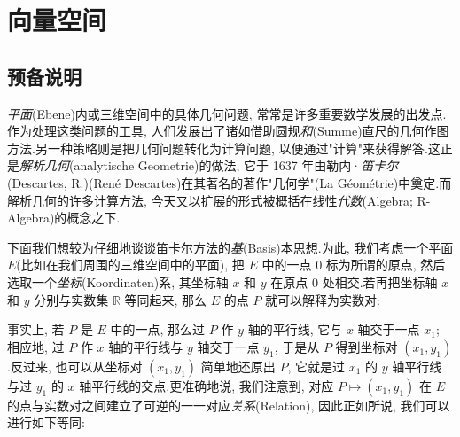 \chapter{向量空间}

\section*{预备说明}

\emph{平面}(\textup{Ebene})内或三维空间中的具体几何问题, 常常是许多重要数学发展的出发点.作为处理这类问题的工具, 人们发展出了诸如借助圆规\emph{和}(\textup{Summe})直尺的几何作图方法.另一种策略则是把几何问题转化为计算问题, 以便通过"计算"来获得解答.这正是\emph{解析几何}(\textup{analytische Geometrie})的做法, 它于 1637 年由勒内·\emph{笛卡尔}(\textup{Descartes, R.})(René Descartes)在其著名的著作"几何学"(La G\'eom\'etrie)中奠定.而解析几何的许多计算方法, 今天又以扩展的形式被概括在线性\emph{代数}(\textup{Algebra; R-Algebra})的概念之下.

下面我们想较为仔细地谈谈笛卡尔方法的\emph{基}(\textup{Basis})本思想.为此, 我们考虑一个平面 $E$(比如在我们周围的三维空间中的平面), 把 $E$ 中的一点 $0$ 标为所谓的原点, 然后选取一个\emph{坐标}(\textup{Koordinaten})系, 其坐标轴 $x$ 和 $y$ 在原点 $0$ 处相交.若再把坐标轴 $x$ 和 $y$ 分别与实数集 $\mathbb{R}$ 等同起来, 那么 $E$ 的点 $P$ 就可以解释为实数对:

\begin{center}
\end{center}

事实上, 若 $P$ 是 $E$ 中的一点, 那么过 $P$ 作 $y$ 轴的平行线, 它与 $x$ 轴交于一点 $x_1$; 相应地, 过 $P$ 作 $x$ 轴的平行线与 $y$ 轴交于一点 $y_1$, 于是从 $P$ 得到坐标对 $(x_1, y_1)$.反过来, 也可以从坐标对 $(x_1, y_1)$ 简单地还原出 $P$, 它就是过 $x_1$ 的 $y$ 轴平行线与过 $y_1$ 的 $x$ 轴平行线的交点.更准确地说, 我们注意到, 对应 $P \longmapsto (x_1, y_1)$ 在 $E$ 的点与实数对之间建立了可逆的一一对应\emph{关系}(\textup{Relation}), 因此正如所说, 我们可以进行如下等同:

